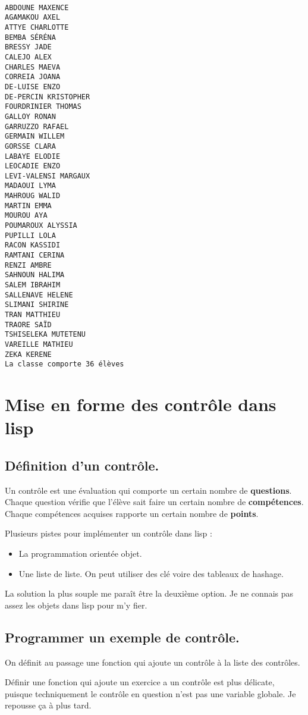 \documentclass[a4paper, 11pt, DIV=18]{scrartcl}
\begin{document}
\begin{verbatim}

ABDOUNE MAXENCE
AGAMAKOU AXEL
ATTYE CHARLOTTE
BEMBA SÉRÉNA
BRESSY JADE
CALEJO ALEX
CHARLES MAEVA
CORREIA JOANA
DE-LUISE ENZO
DE-PERCIN KRISTOPHER
FOURDRINIER THOMAS
GALLOY RONAN
GARRUZZO RAFAEL
GERMAIN WILLEM
GORSSE CLARA
LABAYE ELODIE
LEOCADIE ENZO
LEVI-VALENSI MARGAUX
MADAOUI LYMA
MAHROUG WALID
MARTIN EMMA
MOUROU AYA
POUMAROUX ALYSSIA
PUPILLI LOLA
RACON KASSIDI
RAMTANI CERINA
RENZI AMBRE
SAHNOUN HALIMA
SALEM IBRAHIM
SALLENAVE HELENE
SLIMANI SHIRINE
TRAN MATTHIEU
TRAORE SAÏD
TSHISELEKA MUTETENU
VAREILLE MATHIEU
ZEKA KERENE
La classe comporte 36 élèves
\end{verbatim}

\section{Mise en forme des contrôle dans lisp}
\label{sec:org8359c9a}

\subsection{Définition d'un contrôle.}
\label{sec:orgb87fd53}

Un contrôle est une évaluation qui comporte un certain nombre de \textbf{questions}.
Chaque question vérifie que l'élève sait faire un certain nombre de
\textbf{compétences}. Chaque compétences acquises rapporte un certain nombre de \textbf{points}.

Plusieurs pistes pour implémenter un contrôle dans lisp :
\begin{itemize}
\item La programmation orientée objet.
\item Une liste de liste. On peut utiliser des clé voire des tableaux de hashage.
\end{itemize}

La solution la plus souple me paraît être la deuxième option. Je ne connais pas
assez les objets dans lisp pour m'y fier.

\subsection{Programmer un exemple de contrôle.}
\label{sec:orgf1e3395}

On définit au passage une fonction qui ajoute un contrôle à la liste des contrôles.

Définir une fonction qui ajoute un exercice a un contrôle est plus délicate,
puisque techniquement le contrôle en question n'est pas une variable globale. Je
repousse ça à plus tard.
\end{document}
